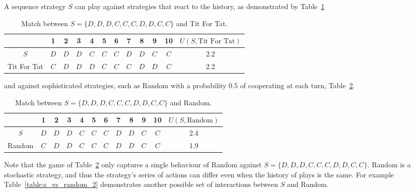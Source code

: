 A sequence strategy \(S\) can play against strategies that react to the history,
as demonstrated by Table~\ref{table:s_vs_tft}

\begin{table}[htb]
\centering
\begin{tabular}{cccccccccccc}
    & \textbf{1} & \textbf{2} & \textbf{3} & \textbf{4}  & \textbf{5} & \textbf{6} & \textbf{7} & \textbf{8}  & \textbf{9} & \textbf{10} &
    \(U(S, \text{Tit For Tat})\) \\ \midrule
    \(S\) & \(D\) & \(D\) & \(D\) & \(C\) & \(C\) & \(C\) & \(D\) & \(D\) & \(C\) & \(C\) & 2.2 \\
    Tit For Tat & \(C\) & \(D\) & \(D\) & \(D\) & \(C\) & \(C\) & \(C\) & \(D\) & \(D\) & \(C\) & 2.2 \\ \bottomrule
\end{tabular}
\caption{Match between \(S = \{D, D, D, C, C, C, D, D, C, C\}\) and Tit For Tat.}\label{table:s_vs_tft}
\end{table}

and against sophisticated strategies, such as Random with a probability \(0.5\)
of cooperating at each turn, Table~\ref{table:s_vs_random}.

\begin{table}[htb]
\centering
\begin{tabular}{cccccccccccc}
    & \textbf{1} & \textbf{2} & \textbf{3} & \textbf{4}  & \textbf{5} & \textbf{6} & \textbf{7} & \textbf{8}  & \textbf{9} & \textbf{10} &
    \(U(S, \text{Random})\) \\ \midrule
    \(S\) & \(D\) & \(D\) & \(D\) & \(C\) & \(C\) & \(C\) & \(D\) & \(D\) & \(C\) & \(C\) & 2.4 \\
    Random & \(C\) & \(D\) & \(D\) & \(C\) & \(C\) & \(C\) & \(D\) & \(D\) & \(C\) & \(C\) & 1.9 \\ \bottomrule
\end{tabular}
\caption{Match between \(S = \{D, D, D, C, C, C, D, D, C, C\}\) and Random.}\label{table:s_vs_random}
\end{table}

Note that the game of Table~\ref{table:s_vs_random} only captures a single
behaviour of Random against \(S = \{D, D, D, C, C, C, D, D, C, C\}\). Random is
a stochastic strategy, and thus the strategy's series of actions can differ even
when the history of plays is the same. For example Table~\ref{table:s_vs_random_2} demonstrates
another possible set of interactions between \(S\) and Random.

